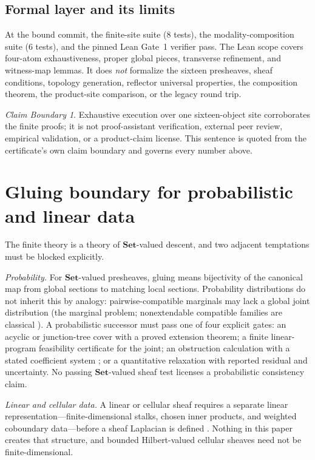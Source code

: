 \documentclass[11pt]{amsart}
\theoremstyle{definition}
\theoremstyle{remark}
\newtheorem{boundary}[theorem]{Claim Boundary}
\newcommand{\Set}{\mathbf{Set}}
\begin{document}
\subsection{Formal layer and its limits}
At the bound commit, the finite-site suite (8 tests), the modality-composition suite (6 tests), and the pinned Lean Gate~1 verifier pass. The Lean scope covers four-atom exhaustiveness, proper global pieces, transverse refinement, and witness-map lemmas. It does \emph{not} formalize the sixteen presheaves, sheaf conditions, topology generation, reflector universal properties, the composition theorem, the product-site comparison, or the legacy round trip.

\begin{boundary}
Exhaustive execution over one sixteen-object site corroborates the finite proofs; it is not proof-assistant verification, external peer review, empirical validation, or a product-claim license. This sentence is quoted from the certificate's own claim boundary and governs every number above.
\end{boundary}

\section{Gluing boundary for probabilistic and linear data}\label{sec:gluing}

The finite theory is a theory of $\Set$-valued descent, and two adjacent temptations must be blocked explicitly.

\emph{Probability.} For $\Set$-valued presheaves, gluing means bijectivity of the canonical map from global sections to matching local sections. Probability distributions do not inherit this by analogy: pairwise-compatible marginals may lack a global joint distribution (the marginal problem; nonextendable compatible families are classical \cite{vorobev}). A probabilistic successor must pass one of four explicit gates: an acyclic or junction-tree cover with a proved extension theorem; a finite linear-program feasibility certificate for the joint; an obstruction calculation with a stated coefficient system \cite{abramskybrandenburger}; or a quantitative relaxation with reported residual and uncertainty. No passing $\Set$-valued sheaf test licenses a probabilistic consistency claim.

\emph{Linear and cellular data.} A linear or cellular sheaf requires a separate linear representation---finite-dimensional stalks, chosen inner products, and weighted coboundary data---before a sheaf Laplacian is defined \cite{hansenghrist}. Nothing in this paper creates that structure, and bounded Hilbert-valued cellular sheaves need not be finite-dimensional.
\end{document}
